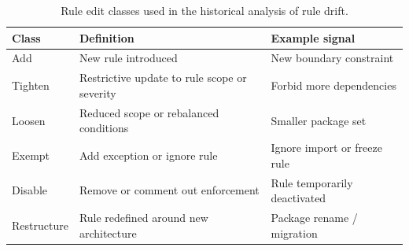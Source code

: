 \begin{table}[t]
\centering
\caption{Rule edit classes used in the historical analysis of rule drift.}
\label{tab:edit_classes}
\setlength{\aboverulesep}{0pt}
\setlength{\belowrulesep}{0pt}
\renewcommand{\arraystretch}{1.25}
\begin{tabular}{p{2.3cm}p{4.3cm}p{2.5cm}}
\toprule
\textbf{Class} & \textbf{Definition} & \textbf{Example signal} \\
\midrule
\rowcolor{rowband}
Add & New rule introduced & New boundary constraint \\
Tighten & Restrictive update to rule scope or severity & Forbid more dependencies \\
\rowcolor{rowband}
Loosen & Reduced scope or rebalanced conditions & Smaller package set \\
Exempt & Add exception or ignore rule & Ignore import or freeze rule \\
\rowcolor{rowband}
Disable & Remove or comment out enforcement & Rule temporarily deactivated \\
Restructure & Rule redefined around new architecture & Package rename / migration \\
\bottomrule
\end{tabular}
\end{table}
